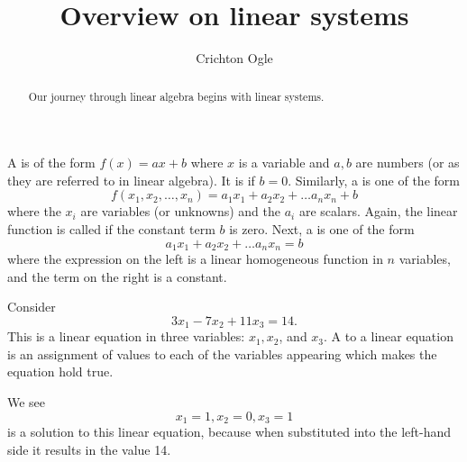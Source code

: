 \documentclass{ximera}
\title{Overview on linear systems}
\author{Crichton Ogle}
\begin{document}
\begin{abstract}
  Our journey through linear algebra begins with linear systems.
\end{abstract}

\maketitle


\begin{definition}
  A  is of the form $f(x) = ax+b$ where $x$ is a variable and $a,b$ are numbers (or  as they are referred to in linear algebra). It is  if $b=0$. Similarly, a  is one of the form
  \[
    f(x_1,x_2,\dots,x_n) = a_1x_1 + a_2x_2 + \dots a_nx_n + b
  \]
  where the $x_i$ are variables (or unknowns) and the $a_i$ are scalars. Again, the linear function is called  if the constant term $b$ is zero. Next, a  is one of the form
  \[
    a_1x_1 + a_2x_2 + \dots a_nx_n =  b
  \]
  where the expression on the left is a linear homogeneous function in $n$ variables, and the term on the right is a constant.
\end{definition}

\begin{example}
  Consider
  \begin{equation}
    3x_1 - 7x_2 + 11x_3 = 14.
  \end{equation}
  This is a linear equation in three variables: $x_1, x_2$, and
  $x_3$. A  to a linear equation is an assignment of
  values to each of the variables appearing which makes the equation
  hold true.

  We see
  \[
    x_1 = 1, x_2 = 0, x_3 = 1
  \]
  is a solution to this linear equation, because when substituted into the left-hand side it results in the value 14.
\end{example}
\end{document}
